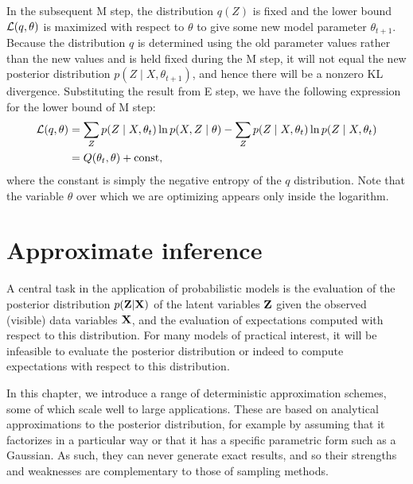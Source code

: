 \documentclass[a4paper]{article}
\begin{document}
In the subsequent M step, the distribution $q(Z)$ is fixed
and the lower bound $\mathcal{L}(q, \theta)$ is maximized with 
respect to $\theta$ to give some new model parameter
$\theta_{t + 1}$. Because the distribution $q$ is determined 
using the old parameter values rather than the new values
and is held fixed during the M step, it will not equal the 
new posterior distribution $p(Z \mid X, \theta_{t+1})$,
and hence there will be a nonzero KL divergence.
Substituting the result from E step, we have the following 
expression for the lower bound of M step: 
\[
\begin{aligned}
  \mathcal{L}(q, \theta)
  &= \sum_Z p(Z \mid X, \theta_t) \ln p(X, Z \mid \theta) 
  - \sum_Z p(Z \mid X, \theta_t) \ln p(Z \mid X, \theta_t) \\
  &= Q(\theta_t, \theta) + \mathrm{const},
\end{aligned}
\]
where the constant is simply the negative entropy of 
the $q$ distribution. Note that the variable $\theta$ 
over which we are optimizing appears only inside the 
logarithm.


\section{Approximate inference} 
A central task in the application of probabilistic models is 
the evaluation of the posterior distribution $p(\boldsymbol{\mathbf{Z}}|\boldsymbol{\mathbf{X}})$ of the 
latent variables $\boldsymbol{\mathbf{Z}}$ given the observed (visible) data variables 
$\boldsymbol{\mathbf{X}}$, and the evaluation of expectations computed with respect 
to this distribution. For many models of practical interest, 
it will be infeasible 
to evaluate the posterior distribution or indeed to compute 
expectations with respect to this distribution.

In this chapter, we introduce a range of deterministic 
approximation schemes, some of which scale well to large 
applications. These are based on analytical approximations 
to the posterior distribution, for example by assuming that 
it factorizes in a particular way or that it has a specific 
parametric form such as a Gaussian. As such, they can never 
generate exact results, and so their strengths and weaknesses 
are complementary to those of sampling methods.
\end{document}
